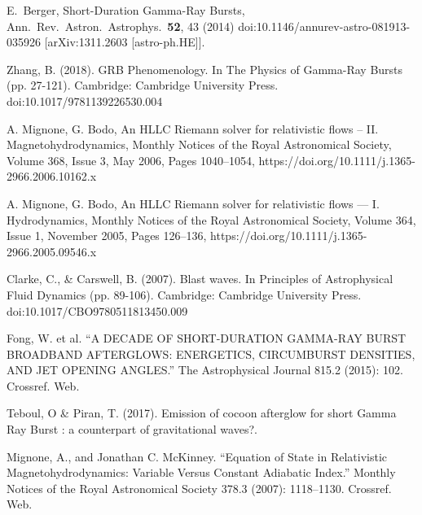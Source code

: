 \documentclass[12pt,a4paper]{book}
\begin{document}
\begin{thebibliography}{20}


      E.~Berger,
      Short-Duration Gamma-Ray Bursts,
      Ann.\ Rev.\ Astron.\ Astrophys.\  {\bf 52}, 43 (2014)
      doi:10.1146/annurev-astro-081913-035926
      [arXiv:1311.2603 [astro-ph.HE]].
     
    
    
    Zhang, B. (2018). GRB Phenomenology. In The Physics of Gamma-Ray Bursts (pp. 27-121). Cambridge: Cambridge University Press. doi:10.1017/9781139226530.004
    
    A. Mignone, G. Bodo, An HLLC Riemann solver for relativistic flows – II. Magnetohydrodynamics, Monthly Notices of the Royal Astronomical Society, Volume 368, Issue 3, May 2006, Pages 1040–1054, https://doi.org/10.1111/j.1365-2966.2006.10162.x
    
    A. Mignone, G. Bodo, An HLLC Riemann solver for relativistic flows — I. Hydrodynamics, Monthly Notices of the Royal Astronomical Society, Volume 364, Issue 1, November 2005, Pages 126–136, https://doi.org/10.1111/j.1365-2966.2005.09546.x
    
    Clarke, C., \& Carswell, B. (2007). Blast waves. In Principles of Astrophysical Fluid Dynamics (pp. 89-106). Cambridge: Cambridge University Press. doi:10.1017/CBO9780511813450.009
    
    Fong, W. et al. “A DECADE OF SHORT-DURATION GAMMA-RAY BURST BROADBAND AFTERGLOWS: ENERGETICS, CIRCUMBURST DENSITIES, AND JET OPENING ANGLES.” The Astrophysical Journal 815.2 (2015): 102. Crossref. Web.
    
    Teboul, O \& Piran, T. (2017). Emission of cocoon afterglow for short Gamma Ray Burst : a counterpart of gravitational waves?. 
    
    Mignone, A., and Jonathan C. McKinney. “Equation of State in Relativistic Magnetohydrodynamics: Variable Versus Constant Adiabatic Index.” Monthly Notices of the Royal Astronomical Society 378.3 (2007): 1118–1130. Crossref. Web.
    

\end{thebibliography}
\end{document}
